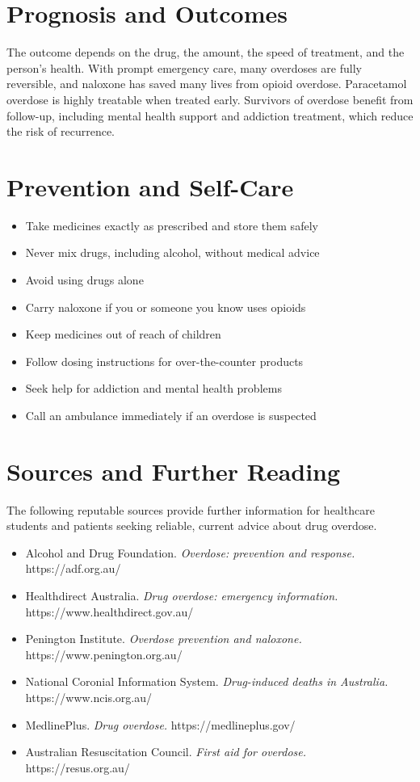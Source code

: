 \section*{Prognosis and Outcomes}
The outcome depends on the drug, the amount, the speed of treatment, and the person's health. With prompt emergency care, many overdoses are fully reversible, and naloxone has saved many lives from opioid overdose. Paracetamol overdose is highly treatable when treated early. Survivors of overdose benefit from follow-up, including mental health support and addiction treatment, which reduce the risk of recurrence.

\section*{Prevention and Self-Care}
\begin{itemize}
    \item Take medicines exactly as prescribed and store them safely
    \item Never mix drugs, including alcohol, without medical advice
    \item Avoid using drugs alone
    \item Carry naloxone if you or someone you know uses opioids
    \item Keep medicines out of reach of children
    \item Follow dosing instructions for over-the-counter products
    \item Seek help for addiction and mental health problems
    \item Call an ambulance immediately if an overdose is suspected
\end{itemize}

\section*{Sources and Further Reading}
The following reputable sources provide further information for healthcare students and patients seeking reliable, current advice about drug overdose.

\begin{itemize}
    \item Alcohol and Drug Foundation. \textit{Overdose: prevention and response.} https://adf.org.au/
    \item Healthdirect Australia. \textit{Drug overdose: emergency information.} https://www.healthdirect.gov.au/
    \item Penington Institute. \textit{Overdose prevention and naloxone.} https://www.penington.org.au/
    \item National Coronial Information System. \textit{Drug-induced deaths in Australia.} https://www.ncis.org.au/
    \item MedlinePlus. \textit{Drug overdose.} https://medlineplus.gov/
    \item Australian Resuscitation Council. \textit{First aid for overdose.} https://resus.org.au/
\end{itemize}
